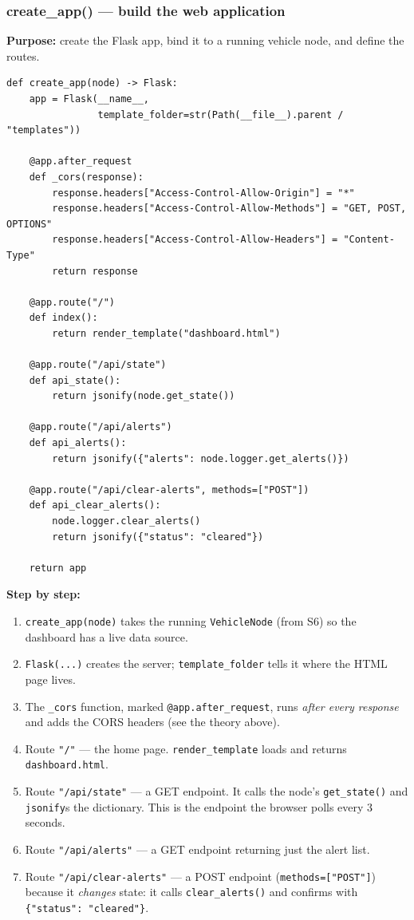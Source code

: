 \documentclass[11pt,a4paper]{article}
\begin{document}
\subsubsection*{create\_app() --- build the web application}
\textbf{Purpose:} create the Flask app, bind it to a running vehicle node, and
define the routes.
\begin{lstlisting}[style=py,caption={dashboard/app.py --- the whole Flask application.}]
def create_app(node) -> Flask:
    app = Flask(__name__,
                template_folder=str(Path(__file__).parent / "templates"))

    @app.after_request
    def _cors(response):
        response.headers["Access-Control-Allow-Origin"] = "*"
        response.headers["Access-Control-Allow-Methods"] = "GET, POST, OPTIONS"
        response.headers["Access-Control-Allow-Headers"] = "Content-Type"
        return response

    @app.route("/")
    def index():
        return render_template("dashboard.html")

    @app.route("/api/state")
    def api_state():
        return jsonify(node.get_state())

    @app.route("/api/alerts")
    def api_alerts():
        return jsonify({"alerts": node.logger.get_alerts()})

    @app.route("/api/clear-alerts", methods=["POST"])
    def api_clear_alerts():
        node.logger.clear_alerts()
        return jsonify({"status": "cleared"})

    return app
\end{lstlisting}
\textbf{Step by step:}
\begin{enumerate}
  \item \texttt{create\_app(node)} takes the running \texttt{VehicleNode} (from
        S6) so the dashboard has a live data source.
  \item \texttt{Flask(...)} creates the server; \texttt{template\_folder} tells
        it where the HTML page lives.
  \item The \texttt{\_cors} function, marked \texttt{@app.after\_request}, runs
        \emph{after every response} and adds the CORS headers (see the theory
        above).
  \item Route \texttt{"/"} --- the home page. \texttt{render\_template} loads and
        returns \texttt{dashboard.html}.
  \item Route \texttt{"/api/state"} --- a GET endpoint. It calls the node's
        \texttt{get\_state()} and \texttt{jsonify}s the dictionary. This is the
        endpoint the browser polls every 3 seconds.
  \item Route \texttt{"/api/alerts"} --- a GET endpoint returning just the alert
        list.
  \item Route \texttt{"/api/clear-alerts"} --- a POST endpoint
        (\texttt{methods=["POST"]}) because it \emph{changes} state: it calls
        \texttt{clear\_alerts()} and confirms with \texttt{\{"status":
        "cleared"\}}.
\end{enumerate}
\end{document}
